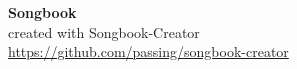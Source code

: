 \documentclass[a5paper, fontsize=18pt]{scrartcl}
\begin{document}
\begin{titlepage}
\begin{center}
\vspace* {\fill}
{\Huge \textbf{Songbook}} \\
\vspace* {\fill}
created with Songbook-Creator \\
{\small{\href{https://github.com/passing/songbook-creator}{https://github.com/passing/songbook-creator}}}
\end{center}
\end{titlepage}

\setcounter{page}{1}



\printindex[interprets]
\printindex[titles]
\end{document}
